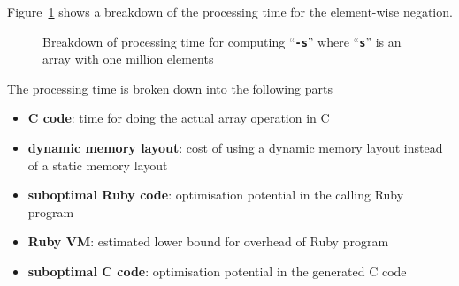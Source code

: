 \documentclass[12pt,a4paper,oneside,openright]{book}
\newcommand{\fig}[1]{Figure~\ref{fig:#1}}
\newcommand{\code}[1]{``\texttt{\textbf{\textcolor{codegray}{\small{#1}}}}''}
\begin{document}
\begin{CJK}{UTF8}{}
\fig{perfpie} shows a breakdown of the processing time for the element-wise negation.
\newcommand{\pgfslice}[4]{
  \pgfmathparse{0.5*#1+0.5*#2}
  \let\midangle\pgfmathresult
  \draw[thick,fill=black!10] (0,0) -- (#1:1) arc (#1:#2:1) -- cycle;
  \node[label=\midangle:#4] at (\midangle:1) {};
  \pgfmathparse{min((#2-#1-10)/110*(-0.3),0)}
  \let\temp\pgfmathresult
  \pgfmathparse{max(\temp,-0.5) + 0.8}
  \let\innerpos\pgfmathresult
  \node at (\midangle:\innerpos) {#3};
}
\begin{figure}[t]
  \begin{center}
    \caption{Breakdown of processing time for computing \code{-s} where \code{s} is an array with one million elements\label{fig:perfpie}}
  \end{center}
\end{figure}
%
%
The processing time is broken down into the following parts
\begin{itemize}
\item \textbf{C code}: time for doing the actual array operation in C
\item \textbf{dynamic memory layout}: cost of using a dynamic memory layout instead of a static memory layout
\item \textbf{suboptimal Ruby code}: optimisation potential in the calling Ruby program
\item \textbf{Ruby VM}: estimated lower bound for overhead of Ruby program
\item \textbf{suboptimal C code}: optimisation potential in the generated C code
\end{itemize}


\end{CJK}
\end{document}
